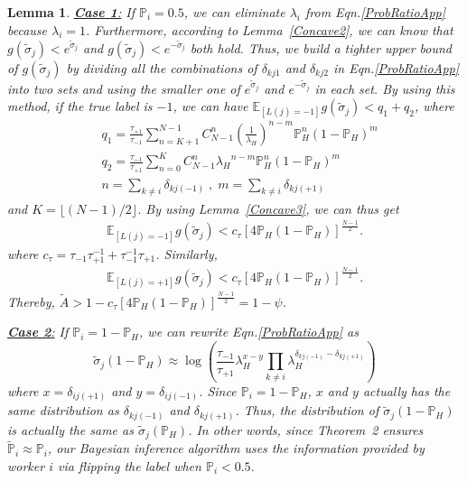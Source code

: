 \documentclass{article}
\makeatletter
\newcounter{lemmas}
\newtheorem{lemma}[lemmas]{Lemma}
\renewenvironment{proof}[1][\proofname]{\par
  \vspace{-\topsep}%
  \pushQED{\qed}%
  \normalfont
  \topsep0pt \partopsep0pt %
  \trivlist
  \item[\hskip\labelsep
        \itshape
    #1\@addpunct{.}]\ignorespaces
}{%
  \popQED\endtrivlist\@endpefalse
  \addvspace{0pt plus 0pt} %
}
\makeatother
\begin{document}
\begin{lemma}
\begin{proof}
\underline{\textbf{Case 1}:} If $\mathbb{P}_i=0.5$, we can eliminate $\lambda_i$ from Eqn.\ref{ProbRatioApp} because $\lambda_i=1$. Furthermore, according to Lemma~\ref{Concave2}, we can know that 
$g(\tilde{\sigma}_j)< e^{\tilde{\sigma}_j}$ and $g(\tilde{\sigma}_j)< e^{-\tilde{\sigma}_j}$ both hold. Thus, we build a tighter upper bound of $g(\tilde{\sigma}_j)$ by dividing all the combinations of $\delta_{kj1}$ and $\delta_{kj2}$ in Eqn.\ref{ProbRatioApp} into two sets and using the smaller one of $e^{\tilde{\sigma}_j}$ and $e^{-\tilde{\sigma}_j}$ in each set.
By using this method, if the true label is $-1$, we can have $\mathbb{E}_{[L(j)=-1]}g(\tilde{\sigma}_j)< q_1+q_2$, where
\begin{equation*}
\begin{split}
&q_1 = \frac{\tau_{+1}}{\tau_{-1}}{\sum}_{n=K+1}^{N-1}C_{N-1}^{n} (\frac{1}{\lambda_H})^{n-m}\mathbb{P}_H^n(1-\mathbb{P}_H)^m\\
&q_2 = \frac{\tau_{-1}}{\tau_{+1}}{\sum}_{n=0}^{K}C_{N-1}^{n} {\lambda_H}^{n-m}\mathbb{P}_H^n(1-\mathbb{P}_H)^m\\
&n={\sum}_{k\neq i}\delta_{kj(-1)}\;,\;m= {\sum}_{k\neq i}\delta_{kj(+1)}
\end{split}
\end{equation*}
and $K=\lfloor (N-1)/2 \rfloor$. By using Lemma~\ref{Concave3}, we can thus get
\begin{equation*}
\begin{split}
\mathbb{E}_{[L(j)=-1]}g(\tilde{\sigma}_j) < c_{\tau}[4\mathbb{P}_H(1-\mathbb{P}_H)]^{\frac{N-1}{2}}.
\end{split}
\end{equation*}
where $c_{\tau}=\tau_{-1}\tau_{+1}^{-1}+\tau_{-1}^{-1}\tau_{+1}$. Similarly,
\begin{equation*}
\begin{split}
\mathbb{E}_{[L(j)=+1]}g(\tilde{\sigma}_j) < c_{\tau}[4\mathbb{P}_H(1-\mathbb{P}_H)]^{\frac{N-1}{2}}.
\end{split}
\end{equation*}
Thereby, $\tilde{A}>1-c_{\tau}[4\mathbb{P}_H(1-\mathbb{P}_H)]^{\frac{N-1}{2}}=1-\psi$.


\underline{\textbf{Case 2}:} If $\mathbb{P}_i=1-\mathbb{P}_H$, we can rewrite Eqn.\ref{ProbRatioApp} as
\begin{equation*}
\tilde{\sigma}_j(1-\mathbb{P}_H)\approx \log\left(\frac{\tau_{-1}}{\tau_{+1}}\lambda_H^{x-y}{\prod}_{k\neq i}\lambda_H^{\delta_{kj(-1)}-\delta_{kj(+1)}}\right)
\end{equation*}
where $x=\delta_{ij(+1)}$ and $y=\delta_{ij(-1)}$. Since $\mathbb{P}_i=1-\mathbb{P}_H$, $x$ and $y$ actually has the same distribution as $\delta_{kj(-1)}$ and $\delta_{kj(+1)}$. Thus, the distribution of $\tilde{\sigma}_j(1-\mathbb{P}_H)$ is actually the same as $\tilde{\sigma}_j(\mathbb{P}_H)$.
In other words, since Theorem~2 ensures $\tilde{\mathbb{P}}_i\approx\mathbb{P}_i$, our Bayesian inference algorithm uses the information provided by worker $i$ via flipping the label when $\mathbb{P}_i<0.5$.



\end{proof}
\end{lemma}
\end{document}
